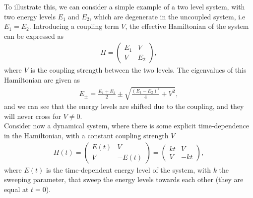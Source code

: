 \documentclass{subfiles}
\begin{document}
To illustrate this, we can consider a simple example of a two level system, with two energy levels $E_1$ and $E_2$, which are degenerate in the uncoupled system, i.e $E_1 = E_2$. Introducing a coupling term $V$, the effective Hamiltonian of the system can be expressed as
\begin{align*}
    H = \begin{pmatrix}
        E_1 & V \\
        V & E_2
    \end{pmatrix},
\end{align*}
where $V$ is the coupling strength between the two levels. The eigenvalues of this Hamiltonian are given as
\begin{align*}
    E_\pm = \frac{E_1 + E_2}{2} \pm \sqrt{\frac{(E_1 - E_2)^2}{4} + V^2},
\end{align*}
and we can see that the energy levels are shifted due to the coupling, and they will never cross for $V\neq0$. \\ 

Consider now a dynamical system, where there is some explicit time-dependence in the Hamiltonian, with a constant coupling strength $V$
\begin{align}
    H(t) = \begin{pmatrix}
        E(t) & V \\
        V & -E(t)
    \end{pmatrix} = \begin{pmatrix}
        kt & V \\
        V & -kt
    \end{pmatrix} \label{eq:landau_zener},
\end{align}
where $E(t)$ is the time-dependent energy level of the system, with $k$ the sweeping parameter, that sweep the energy levels towards each other (they are equal at $t=0$). 
\end{document}
